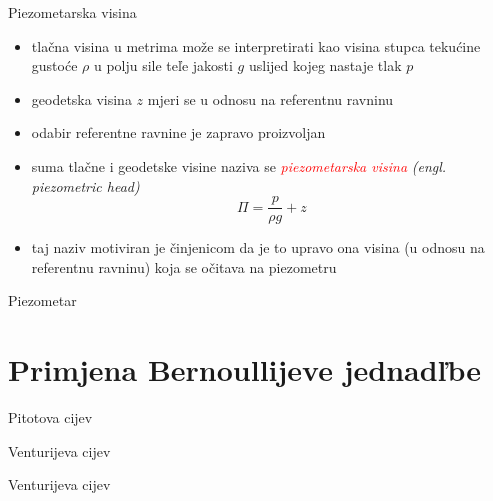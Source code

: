 \documentclass[croatian]{beamer}
\begin{document}
\begin{frame}{Piezometarska visina}

\begin{itemize}
\item tlačna visina u metrima može se interpretirati kao visina stupca tekućine
gustoće $\rho$ u polju sile teľe jakosti $g$ uslijed kojeg nastaje
tlak $p$
\item geodetska visina $z$ mjeri se u odnosu na referentnu ravninu
\item odabir referentne ravnine je zapravo proizvoljan
\item suma tlačne i geodetske visine naziva se \textcolor{red}{\emph{piezometarska
visina }}\emph{(engl. piezometric head)}
\[
\Pi=\frac{p}{\rho g}+z
\]
\item taj naziv motiviran je činjenicom da je to upravo ona visina (u odnosu
na referentnu ravninu) koja se očitava na piezometru
\end{itemize}
\end{frame}

\begin{frame}{Piezometar}

\begin{figure}
\end{figure}
\end{frame}

\section{Primjena Bernoullijeve jednadľbe}

\begin{frame}{Pitotova cijev}

\begin{figure}
\end{figure}
\end{frame}

\begin{frame}{Venturijeva cijev}

\begin{figure}
\end{figure}
\end{frame}

\begin{frame}{Venturijeva cijev}

\begin{figure}
\end{figure}
\end{frame}
\end{document}
